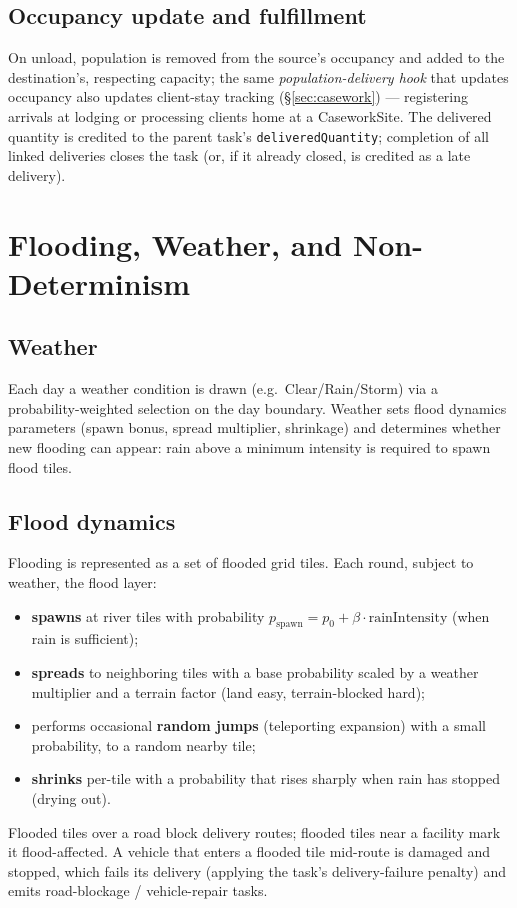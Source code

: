 \documentclass[11pt]{article}
\newcommand{\code}[1]{\texttt{\small #1}}
\begin{document}
\subsection{Occupancy update and fulfillment}
On unload, population is removed from the source's occupancy and added to the
destination's, respecting capacity; the same \emph{population-delivery hook}
that updates occupancy also updates client-stay tracking
(\S\ref{sec:casework}) --- registering arrivals at lodging or processing clients
home at a CaseworkSite. The delivered quantity is credited to the parent task's
\code{deliveredQuantity}; completion of all linked deliveries closes the task
(or, if it already closed, is credited as a late delivery).

\section{Flooding, Weather, and Non-Determinism}
\label{sec:flood}

\subsection{Weather}
Each day a weather condition is drawn (e.g.\ Clear/Rain/Storm) via a
probability-weighted selection on the day boundary. Weather sets flood dynamics
parameters (spawn bonus, spread multiplier, shrinkage) and determines whether new
flooding can appear: rain above a minimum intensity is required to spawn flood
tiles.

\subsection{Flood dynamics}
Flooding is represented as a set of flooded grid tiles. Each round, subject to
weather, the flood layer:
\begin{itemize}[nosep]
\item \textbf{spawns} at river tiles with probability
  $p_{\text{spawn}} = p_0 + \beta\cdot \text{rainIntensity}$ (when rain is
  sufficient);
\item \textbf{spreads} to neighboring tiles with a base probability scaled by a
  weather multiplier and a terrain factor (land easy, terrain-blocked hard);
\item performs occasional \textbf{random jumps} (teleporting expansion) with a
  small probability, to a random nearby tile;
\item \textbf{shrinks} per-tile with a probability that rises sharply when rain
  has stopped (drying out).
\end{itemize}
Flooded tiles over a road block delivery routes; flooded tiles near a facility
mark it flood-affected. A vehicle that enters a flooded tile mid-route is damaged
and stopped, which fails its delivery (applying the task's delivery-failure
penalty) and emits road-blockage / vehicle-repair tasks.
\end{document}
